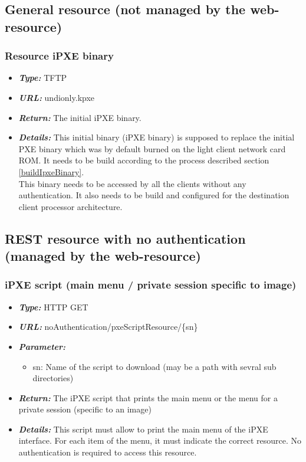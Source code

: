 \documentclass[12pt]{article}											%
\begin{document}
\subsection{General resource (not managed by the web-resource)}
	\subsubsection{Resource iPXE binary}
		\begin{itemize}
			\item \textbf{\textit{Type:}} TFTP
			\item \textbf{\textit{URL:}} undionly.kpxe
			\item \textbf{\textit{Return:}} The initial iPXE binary.
			\item \textbf{\textit{Details:}} This initial binary (iPXE binary) is supposed to replace the initial PXE binary which was by default burned on the light client network card ROM.  It needs to be build according to the process described section \ref{buildIpxeBinary}.\\
            This binary needs to be accessed by all the clients without any authentication.   It also needs to be build and configured for the destination client processor architecture.
		\end{itemize}


	\subsection{REST resource with no authentication (managed by the web-resource)}
		\subsubsection{iPXE script (main menu / private session specific to image)} \label{resource_noAuthentication_script}
			\begin{itemize}
				\item \textbf{\textit{Type:}} HTTP GET
				\item \textbf{\textit{URL:}} noAuthentication/pxeScriptResource/\{sn\}
				\item \textbf{\textit{Parameter:}}
					\begin{itemize}
						\item sn: Name of the script to download (may be a path with sevral sub directories)
					\end{itemize}
				\item \textbf{\textit{Return:}} The iPXE script that prints the main menu or the menu for a private session (specific to an image)
				\item \textbf{\textit{Details:}} This script must allow to print the main menu of the iPXE interface.   For each item of the menu, it must indicate the correct resource.   No authentication is required to access this resource.
			\end{itemize}
\end{document}
